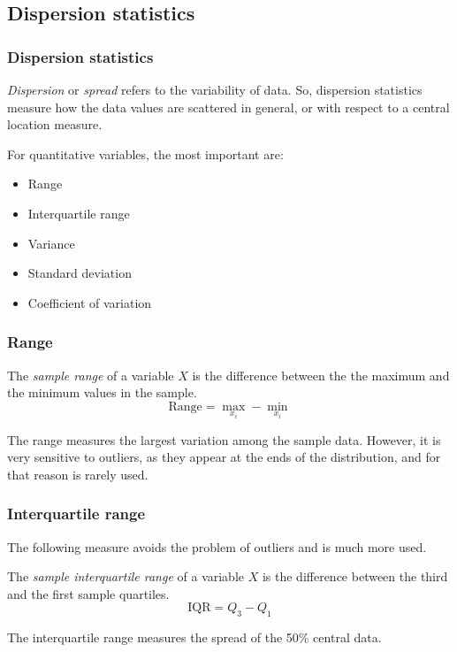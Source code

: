 \subsection{Dispersion statistics}
\begin{frame}
\frametitle{Dispersion statistics}
\emph{Dispersion} or \emph{spread} refers to the variability of data. 
So, dispersion statistics measure how the data values are scattered in general, or with respect to a central location
measure. 

For quantitative variables, the most important are:
\begin{itemize}
\item Range
\item Interquartile range
\item Variance
\item Standard deviation
\item Coefficient of variation
\end{itemize}
\end{frame}


\begin{frame}
\frametitle{Range}
\begin{definition}
The \emph{sample range} of a variable $X$ is the difference between the the maximum and the minimum values in the sample.
\[\text{Range} = \max_{x_i} -\min_{x_i}\]
\end{definition}

The range measures the largest variation among the sample data. 
However, it is very sensitive to outliers, as they appear at the ends of the distribution, and for that reason is
rarely used. 
\begin{center}
\scalebox{0.8}{}
\end{center}
\end{frame}


\begin{frame}
\frametitle{Interquartile range}
The following measure avoids the problem of outliers and is much more used.

\begin{definition}
The \emph{sample interquartile range} of a variable $X$ is the difference between the third and the first
sample quartiles.
\[\text{IQR} = Q_3 -Q_1\]
\end{definition}
\begin{center}
\scalebox{0.8}{}
\end{center}

The interquartile range measures the spread of the 50\% central data.
\end{frame}


